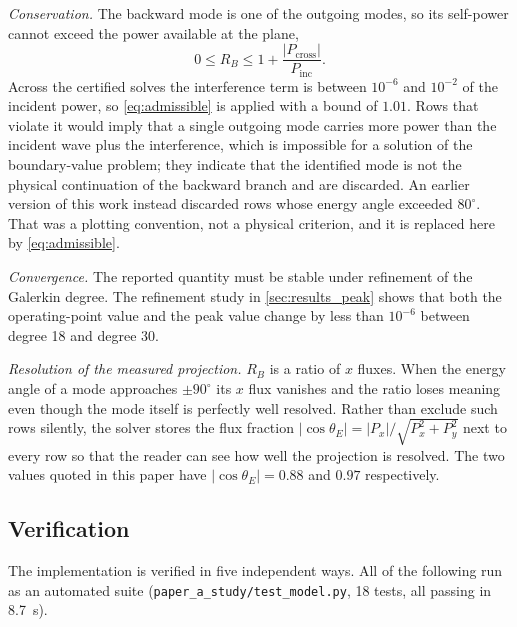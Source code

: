 \emph{Conservation.}  The backward mode is one of the outgoing modes, so its
self-power cannot exceed the power available at the plane,
\begin{equation}
\label{eq:admissible}
0\le R_B\le1+\frac{|P_{\text{cross}}|}{P_{\text{inc}}} .
\end{equation}
Across the certified solves the interference term is between $10^{-6}$ and
$10^{-2}$ of the incident power, so \eqref{eq:admissible} is applied with a
bound of $1.01$.  Rows that violate it would imply that a single outgoing mode
carries more power than the incident wave plus the interference, which is
impossible for a solution of the boundary-value problem; they indicate that the
identified mode is not the physical continuation of the backward branch and are
discarded.  An earlier version of this work instead discarded rows whose energy
angle exceeded $80^{\circ}$.  That was a plotting convention, not a physical
criterion, and it is replaced here by \eqref{eq:admissible}.

\emph{Convergence.}  The reported quantity must be stable under refinement of
the Galerkin degree.  The refinement study in
\cref{sec:results_peak} shows that both the operating-point value and the peak
value change by less than $10^{-6}$ between degree 18 and degree 30.

\emph{Resolution of the measured projection.}  $R_B$ is a ratio of $x$ fluxes.
When the energy angle of a mode approaches $\pm90^{\circ}$ its $x$ flux
vanishes and the ratio loses meaning even though the mode itself is perfectly
well resolved.  Rather than exclude such rows silently, the solver stores the
flux fraction $|\cos\theta_E|=|P_x|/\sqrt{P_x^2+P_y^2}$ next to every row so
that the reader can see how well the projection is resolved.  The two values
quoted in this paper have $|\cos\theta_E|=0.88$ and $0.97$ respectively.

\subsection{Verification}
\label{sec:numerics_verification}

The implementation is verified in five independent ways.  All of the following
run as an automated suite (\texttt{paper\_a\_study/test\_model.py}, 18 tests,
all passing in \SI{8.7}{\second}).

